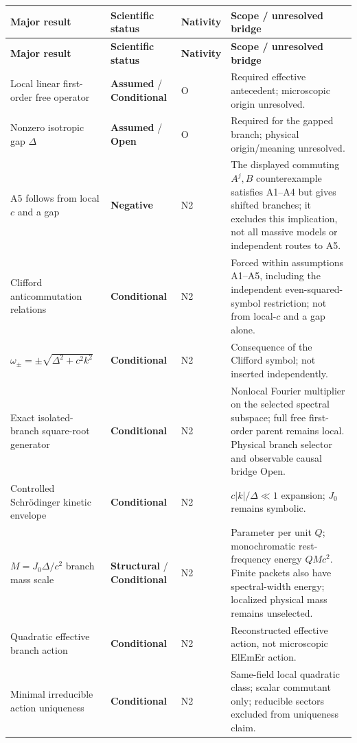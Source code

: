 \documentclass[11pt]{article}
\theoremstyle{definition}
\newcommand{\ElEmEr}{\mbox{ElEmEr}}
\newcommand{\statusStructural}{\textcolor{blue!55!black}{\textbf{Structural}}}
\newcommand{\statusAssumed}{\textcolor{orange!80!black}{\textbf{Assumed}}}
\newcommand{\statusConditional}{\textcolor{yellow!60!black}{\textbf{Conditional}}}
\newcommand{\statusNegative}{\textcolor{red!65!black}{\textbf{Negative}}}
\newcommand{\statusOpen}{\textcolor{red!75!black}{\textbf{Open}}}
\begin{document}
\begingroup
\small
\setlength{\tabcolsep}{3pt}
\begin{longtable}{P{3.7cm}P{2.7cm}P{1.45cm}P{6.6cm}}
\toprule
\textbf{Major result} & \textbf{Scientific status} & \textbf{Nativity} & \textbf{Scope / unresolved bridge}\\
\midrule
\endfirsthead
\toprule
\textbf{Major result} & \textbf{Scientific status} & \textbf{Nativity} & \textbf{Scope / unresolved bridge}\\
\midrule
\endhead
Local linear first-order free operator & \statusAssumed{} / \statusConditional{} & O & Required effective antecedent; microscopic origin unresolved.\\
Nonzero isotropic gap $\Delta$ & \statusAssumed{} / \statusOpen{} & O & Required for the gapped branch; physical origin/meaning unresolved.\\
A5 follows from local $c$ and a gap & \statusNegative{} & N2 & The displayed commuting $A^j,B$ counterexample satisfies A1--A4 but gives shifted branches; it excludes this implication, not all massive models or independent routes to A5.\\
Clifford anticommutation relations & \statusConditional{} & N2 & Forced within assumptions A1--A5, including the independent even-squared-symbol restriction; not from local-$c$ and a gap alone.\\
$\omega_\pm=\pm\sqrt{\Delta^2+c^2k^2}$ & \statusConditional{} & N2 & Consequence of the Clifford symbol; not inserted independently.\\
Exact isolated-branch square-root generator & \statusConditional{} & N2 & Nonlocal Fourier multiplier on the selected spectral subspace; full free first-order parent remains local. Physical branch selector and observable causal bridge Open.\\
Controlled Schr\"odinger kinetic envelope & \statusConditional{} & N2 & $c|k|/\Delta\ll1$ expansion; $J_0$ remains symbolic.\\
$M=J_0\Delta/c^2$ branch mass scale & \statusStructural{} / \statusConditional{} & N2 & Parameter per unit $Q$; monochromatic rest-frequency energy $QMc^2$. Finite packets also have spectral-width energy; localized physical mass remains unselected.\\
Quadratic effective branch action & \statusConditional{} & N2 & Reconstructed effective action, not microscopic \ElEmEr{} action.\\
Minimal irreducible action uniqueness & \statusConditional{} & N2 & Same-field local quadratic class; scalar commutant only; reducible sectors excluded from uniqueness claim.\\

\end{longtable}
\end{document}
